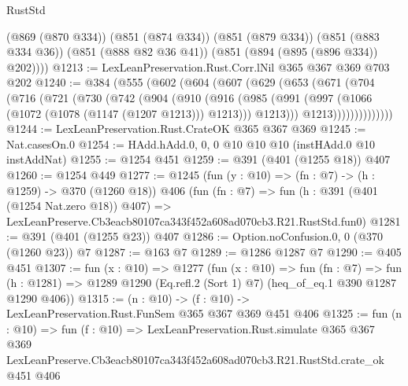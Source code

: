 \begin{lexlean}{RustStd}
\begin{coremodule}
        (@869 (@870 @334))
        (@851 (@874 @334))
        (@851 (@879 @334))
        (@851 (@883 @334 @36))
        (@851 (@888 @82 @36 @41))
        (@851 (@894 (@895 (@896 @334)) @202))))
@1213 := LexLeanPreservation.Rust.Corr.lNil @365 @367 @369 @703 @202
@1240 := @384
    (@555
      (@602
        (@604
          (@607
            (@629
              (@653
                (@671
                  (@704
                    (@716
                      (@721
                        (@730
                          (@742
                            (@904
                              (@910
                                (@916
                                  (@985
                                    (@991
                                      (@997 (@1066 (@1072 (@1078 (@1147 (@1207 @1213))) @1213)))
                                      @1213)))
                                @1213))))))))))))))
@1244 := LexLeanPreservation.Rust.CrateOK @365 @367 @369
@1245 := Nat.casesOn.{0}
@1254 := HAdd.hAdd.{0, 0, 0} @10 @10 @10 (instHAdd.{0} @10 instAddNat)
@1255 := @1254 @451
@1259 := @391 (@401 (@1255 @18)) @407
@1260 := @1254 @449
@1277 := @1245
    (fun (y : @10) => (fn : @7) -> (h : @1259) -> @370 (@1260 @18))
    @406
    (fun (fn : @7) =>
    fun (h : @391 (@401 (@1254 Nat.zero @18)) @407) =>
    LexLeanPreserve.Cb3eacb80107ca343f452a608ad070cb3.R21.RustStd.fun0)
@1281 := @391 (@401 (@1255 @23)) @407
@1286 := Option.noConfusion.{0, 0} (@370 (@1260 @23)) @7
@1287 := @163 @7
@1289 := @1286 @1287 @7
@1290 := @405 @451
@1307 := fun (x : @10) =>
  @1277
    (fun (x : @10) =>
    fun (fn : @7) =>
    fun (h : @1281) => @1289 @1290 (Eq.refl.{2} (Sort 1) @7) (heq_of_eq.{1} @390 @1287 @1290 @406))
@1315 := (n : @10) -> (f : @10) -> LexLeanPreservation.Rust.FunSem @365 @367 @369 @451 @406
@1325 := fun (n : @10) =>
  fun (f : @10) =>
  LexLeanPreservation.Rust.simulate
    @365
    @367
    @369
    LexLeanPreserve.Cb3eacb80107ca343f452a608ad070cb3.R21.RustStd.crate_ok
    @451
    @406
\end{coremodule}
\end{lexlean}
